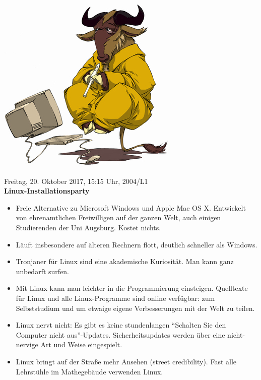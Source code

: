 \documentclass[a4paper,ngerman,landscape,12pt]{scrartcl}
\begin{document}
\begin{center}
  \includegraphics[height=0.2\textheight]{gnu}

  Freitag, 20. Oktober 2017, 15:15 Uhr, 2004/L1 \\
  \mbox{\textbf{Linux-Installationsparty}}

  \Large
  \begin{minipage}{0.99\textwidth}
    \setlength\parskip{\medskipamount}
    \vspace{0.3em}
    \begin{itemize}
      \item Freie Alternative zu Microsoft Windows und Apple Mac OS X.
      Entwickelt von ehrenamtlichen Freiwilligen auf der ganzen Welt,
      auch einigen Studierenden der Uni Augsburg. Kostet nichts.
      \item Läuft insbesondere auf älteren Rechnern flott, deutlich schneller
      als Windows.
      \item Tronjaner für Linux sind eine akademische Kuriosität. Man
      kann ganz unbedarft surfen.
      \item Mit Linux kann man leichter in die Programmierung einsteigen.
      Quelltexte für Linux und alle Linux-Programme sind online verfügbar: zum
      Selbststudium und um etwaige eigene Verbesserungen mit der Welt zu
      teilen.
      \item Linux nervt nicht: Es gibt es keine stundenlangen "`Schalten Sie
      den Computer nicht aus"'-Updates. Sicherheitsupdates werden über eine
      nicht-nervige Art und Weise eingespielt.
      \item Linux bringt auf der Straße mehr Ansehen (street credibility).
      Fast alle Lehrstühle im Mathegebäude verwenden Linux.
    \end{itemize}
  \end{minipage}
  \justifying


\end{center}
\end{document}
